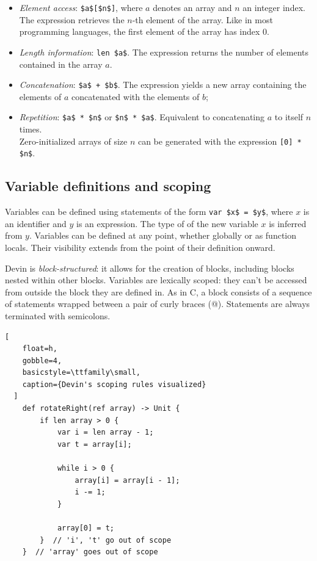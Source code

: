 \documentclass[UdineBachThesis,american,11pt]{PhdThesis}
\begin{document}
  \begin{itemize}
    \item \emph{Element access}: \lstinline[mathescape]@$a$[$n$]@, where $a$
    denotes an array and $n$ an integer index. The expression retrieves the
    $n$-th element of the array. Like in most programming languages, the first
    element of the array has index $0$.

    \item \emph{Length information}: \lstinline[mathescape]@len $a$@. The
    expression returns the number of elements contained in the array $a$.

    \item \emph{Concatenation}: \lstinline[mathescape]@$a$ + $b$@. The
    expression yields a new array containing the elements of $a$ concatenated
    with the elements of $b$;

    \item \emph{Repetition}: \lstinline[mathescape]@$a$ * $n$@ or
    \lstinline[mathescape]@$n$ * $a$@. Equivalent to concatenating $a$ to itself
    $n$ times. \\
    Zero-initialized arrays of size $n$ can be generated with the expression
    \lstinline[mathescape]@[0] * $n$@.
  \end{itemize}

  \subsection{Variable definitions and scoping}

  Variables can be defined using statements of the form
  \lstinline[mathescape]@var $x$ = $y$@, where $x$ is an identifier and $y$ is
  an expression. The type of of the new variable $x$ is inferred from $y$.
  Variables can be defined at any point, whether globally or as function locals.
  Their visibility extends from the point of their definition onward.

  Devin is \emph{block-structured}: it allows for the creation of blocks,
  including blocks nested within other blocks. Variables are lexically scoped:
  they can't be accessed from outside the block they are defined in. As in C, a
  block consists of a sequence of statements wrapped between a pair of curly
  braces (@). Statements are always terminated with
  semicolons.

  \begin{lstlisting}[
    float=h,
    gobble=4,
    basicstyle=\ttfamily\small,
    caption={Devin's scoping rules visualized}
  ]
    def rotateRight(ref array) -> Unit {
        if len array > 0 {
            var i = len array - 1;
            var t = array[i];

            while i > 0 {
                array[i] = array[i - 1];
                i -= 1;
            }

            array[0] = t;
        }  // 'i', 't' go out of scope
    }  // 'array' goes out of scope
  \end{lstlisting}
\end{document}
